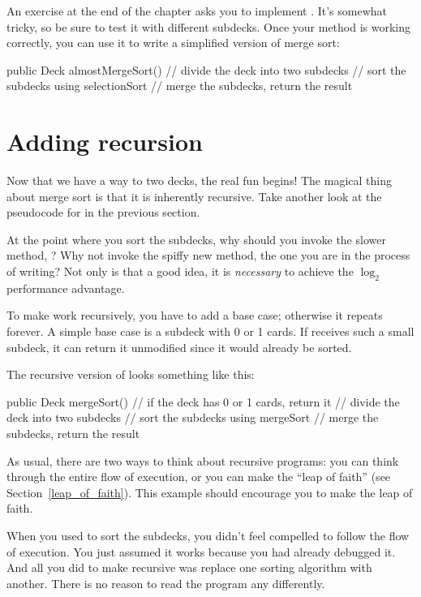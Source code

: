 An exercise at the end of the chapter asks you to implement .
It's somewhat tricky, so be sure to test it with different subdecks.
Once your  method is working correctly, you can use it to write a simplified version of merge sort:

\begin{code}
public Deck almostMergeSort() {
    // divide the deck into two subdecks
    // sort the subdecks using selectionSort
    // merge the subdecks, return the result
}
\end{code}


\section{Adding recursion}

Now that we have a way to  two decks, the real fun begins!
The magical thing about merge sort is that it is inherently recursive.
Take another look at the pseudocode for  in the previous section.

At the point where you sort the subdecks, why should you invoke the slower method, ?
Why not invoke the spiffy new  method, the one you are in the process of writing?
Not only is that a good idea, it is {\em necessary} to achieve the $\log_2$ performance advantage.

To make  work recursively, you have to add a base case; otherwise it repeats forever.
A simple base case is a subdeck with 0 or 1 cards.
If  receives such a small subdeck, it can return it unmodified since it would already be sorted.

The recursive version of  looks something like this:

\begin{code}
public Deck mergeSort() {
    // if the deck has 0 or 1 cards, return it
    // divide the deck into two subdecks
    // sort the subdecks using mergeSort
    // merge the subdecks, return the result
}
\end{code}


As usual, there are two ways to think about recursive programs: you can think through the entire flow of execution, or you can make the ``leap of faith'' (see Section~\ref{leap_of_faith}).
This example should encourage you to make the leap of faith.

When you used  to sort the subdecks, you didn't feel compelled to follow the flow of execution.
You just assumed it works because you had already debugged it.
And all you did to make  recursive was replace one sorting algorithm with another.
There is no reason to read the program any differently.


